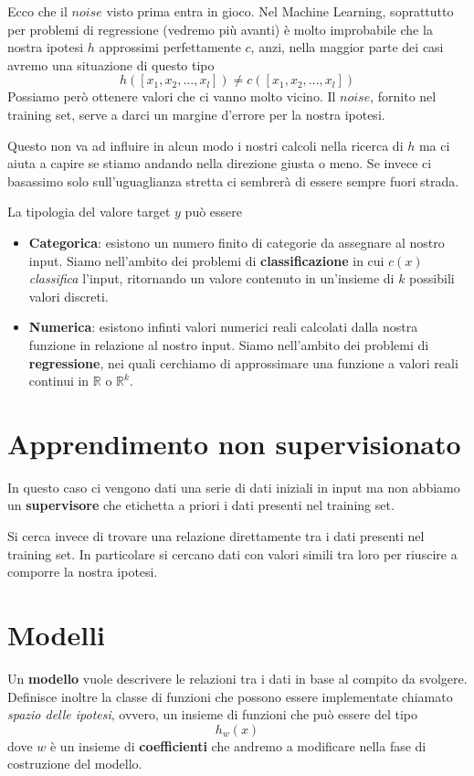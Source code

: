 Ecco che il $noise$ visto prima entra in gioco. Nel Machine Learning, soprattutto per problemi di regressione (vedremo pi\`u
avanti) \`e molto improbabile che la nostra ipotesi $h$ approssimi perfettamente $c$, anzi, nella maggior parte dei casi
avremo una situazione di questo tipo
\[ h([x_1, x_2, \dots, x_l]) \neq c([x_1, x_2, \dots, x_l])\]
Possiamo per\`o ottenere valori che ci vanno molto vicino. Il $noise$, fornito nel training set, serve a darci un margine
d'errore per la nostra ipotesi.

Questo non va ad influire in alcun modo i nostri calcoli nella ricerca di $h$ ma ci aiuta a capire se stiamo andando nella
direzione giusta o meno. Se invece ci basassimo solo sull'uguaglianza stretta ci sembrer\`a di essere sempre fuori strada.

La tipologia del valore target $y$ pu\`o essere
\begin{itemize}
	\item \textbf{Categorica}: esistono un numero finito di categorie da assegnare al nostro input. Siamo nell'ambito
	      dei problemi di \textbf{classificazione} in cui $c(x)$ \emph{classifica} l'input, ritornando un valore contenuto
	      in un'insieme di $k$ possibili valori discreti.
	\item \textbf{Numerica}: esistono infinti valori numerici reali calcolati dalla nostra funzione in relazione al nostro
	      input. Siamo nell'ambito dei problemi di \textbf{regressione}, nei quali cerchiamo di approssimare una funzione a
	      valori reali continui in $\mathbb{R}$ o $\mathbb{R}^k$.
\end{itemize}

\section{Apprendimento non supervisionato}
In questo caso ci vengono dati una serie di dati iniziali in input ma non abbiamo un \textbf{supervisore} che etichetta
a priori i dati presenti nel training set.

Si cerca invece di trovare una relazione direttamente tra i dati presenti nel training set. In particolare si
cercano dati con valori simili tra loro per riuscire a comporre la nostra ipotesi.

\section{Modelli}
Un \textbf{modello} vuole descrivere le relazioni tra i dati in base al compito da svolgere. Definisce inoltre la classe
di funzioni che possono essere implementate chiamato \emph{spazio delle ipotesi}, ovvero, un insieme di funzioni
che pu\`o essere del tipo
\[ h_w(x) \]
dove $w$ \`e un insieme di \textbf{coefficienti} che andremo a modificare nella fase di costruzione del modello.

